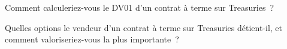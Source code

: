 \begin{interviewq}\label{iq:m2:bond-futures:5}
Comment calculeriez-vous le DV01 d'un contrat à terme sur Treasuries~?
\end{interviewq}

\begin{interviewq}\label{iq:m2:bond-futures:6}
Quelles options le vendeur d'un contrat à terme sur Treasuries détient-il, et comment
valoriseriez-vous la plus importante~?
\end{interviewq}
